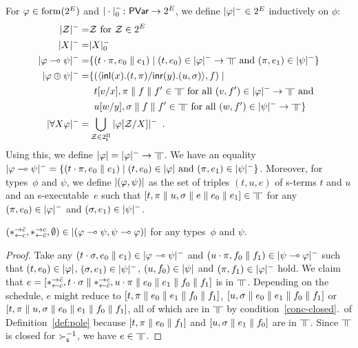 For $\varphi\in\mathrm{form}(2^E)$ and $|\cdot|^-_0\colon\mathsf{PVar}\rightarrow 2^E$\kern
-2pt,
we define $|{\varphi}|^-\in
2^E$ inductively on $\phi$:
\begin{align*}
 \nsem{\mathcal Z} =& \mathcal Z \text{ for } \mathcal Z\in 2^E\\
 \nsem{X}=& |X|_0^- \\
 \nsem{\phi\limp\psi}=&
 \{(t\cdot\pi, e_0\conc e_1)\mid
 (t,e_0)\in\nsem\phi\rightarrow\bbot \text{ and }(\pi,e_1)\in\nsem\psi\}\\
\nsem{\phi\oplus\psi}=& \{(\mats x{t}{\pi}y{u}{\sigma}, f)\mid\\ &
\,\,\,  t[v/x],\pi\conc f\conc f'\in\bbot \text{ for all } (v,f')\in\nsem{\phi}\rightarrow\bbot\text{
 and }\\ &
\,\,\, u[w/y],\sigma\conc f\conc f'\in\bbot \text{ for all } (w,f')\in\nsem{\psi}\rightarrow\bbot\}
 \\
 \nsem{\forall X\phi}=&
 \bigcup_{\mathcal Z\in 2^\sPi} \nsem{\phi[\mathcal Z/X]}\enspace.
\end{align*}
Using this, we define $\sem \phi=\nsem{\phi}\rightarrow\bbot$.
We have an equality
$|{\varphi\multimap\psi}|^- = \{(t\cdot\pi, e_0\parallel e_1)\mid
(t,e_0)\in|{\varphi}|\text{ and }(\pi,e_1)\in|{\psi}|^-\}$.
Moreover, for types~$\phi$ and $\psi$, we define $|{(\varphi,\psi)}|$
as the set of triples $(t,u,e)$ of s-terms $t$ and $u$ and an s-executable~$e$
such
that
$[t,\pi\conc u,\sigma\conc e\conc e_0\conc e_1]
\in\bbot$ for any $(\pi,e_0)\in|{\varphi}|^-$
and $(\sigma,e_1)\in|{\psi}|^-$.

\begin{proposition}
 \label{comod-type}
 $(\ast^{\rightarrow {\bar{c}}}_{\leftarrow{c}},\ast^{\rightarrow {c}}_{\leftarrow{\bar{c}}},\emptyset)\in|{(\varphi\multimap\psi,\psi\multimap\varphi)}|$
 for any types~$\phi$ and $\psi$.
\end{proposition}
\begin{proof}
 Take any $(t\cdot\sigma,e_{0}\parallel e_{1})\in|{\varphi\multimap\psi}|^-$
 and $(u\cdot\pi,f_{0}\parallel f_{1})\in|{\psi\multimap\varphi}|^-$ such that
 $(t, e_{0})\in|{\varphi}|$, $(\sigma,e_{1})\in|{\psi}|^-$,
 $(u, f_{0})\in|{\psi}|$ and $(\pi,f_{1})\in|{\varphi}|^-$ hold.
 We claim that $e=[\ast^{\rightarrow {\bar{c}}}_{\leftarrow{c}},t\cdot\sigma\parallel\ast^{\rightarrow {c}}_{\leftarrow{\bar{c}}},u\cdot\pi\parallel
 e_{0}\parallel e_{1}\parallel f_{0}\parallel f_{1}]$ is in
 $\bbot$.
 Depending on the schedule, $e$ might reduce to
 $ [t,\pi\parallel e_{0}\parallel e_{1}\parallel f_{0}\parallel f_{1}]$,
 $ [u,\sigma\parallel e_{0}\parallel e_{1}\parallel f_{0}\parallel f_{1}]$ or
 $ [t,\pi\parallel u,\sigma\parallel e_{0}\parallel e_{1}\parallel f_{0}\parallel f_{1}]$,
 all of which are in $\bbot$ by condition~\ref{conc-closed}.~of
 Definition~\ref{def:pole} because
 $[t,\pi\parallel e_{0}\parallel f_{1}]$ and
 $[u,\sigma\parallel e_{1}\parallel f_{0}]$ are in $\bbot$.
 Since $\bbot$ is closed for $\succ_{\mathsf s}^{-1}$,
 we have $e\in\bbot$.
\end{proof}

